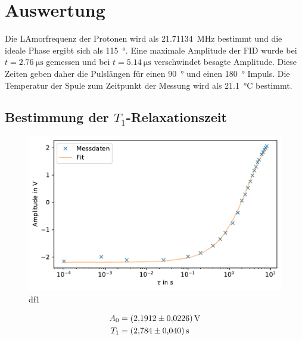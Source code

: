 \section{Auswertung}
\label{sec:Auswertung}
Die LAmorfrequenz der Protonen wird als \SI{21.71134}{\mega\hertz} bestimmt und die ideale Phase ergibt sich als \SI{115}{\degree}.
Eine maximale Amplitude der FID wurde bei $t =  \SI{2.76}{\micro\second}$ gemessen und bei $t = \SI{5.14}{\micro\second}$ verschwindet besagte Amplitude.
Diese Zeiten geben daher die Pulslängen für einen \SI{90}{\degree} und einen \SI{180}{\degree} Impuls.
Die Temperatur der Spule zum Zeitpunkt der Messung wird als \SI{21.1}{\celsius} bestimmt.

\subsection{Bestimmung der $T_1$-Relaxationszeit}
\begin{figure}
    \center
    \includegraphics[scale = 1]{plots/df1.pdf}
    \caption{df1}
    \label{fig:df1}
\end{figure}
\begin{align*}
    A_0 &= \SI{2.1912 +- 0.0226}{\volt}\\
    T_1 &= \SI{2.784 +- 0.04}{\second}
\end{align*}
